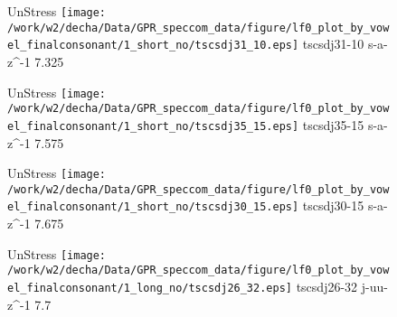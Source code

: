 \documentclass{article}
\begin{document}
\begin{figure}[t]
\begin{minipage}[b]{.24\textwidth}
UnStress
\centering
\texttt{[image: /work/w2/decha/Data/GPR\_speccom\_data/figure/lf0\_plot\_by\_vowel\_finalconsonant/1\_short\_no/tscsdj31\_10.eps]}
tscsdj31-10 s-a-z\textasciicircum-1 7.325
\end{minipage}
\begin{minipage}[b]{.24\textwidth}
UnStress
\centering
\texttt{[image: /work/w2/decha/Data/GPR\_speccom\_data/figure/lf0\_plot\_by\_vowel\_finalconsonant/1\_short\_no/tscsdj35\_15.eps]}
tscsdj35-15 s-a-z\textasciicircum-1 7.575
\end{minipage}
\begin{minipage}[b]{.24\textwidth}
UnStress
\centering
\texttt{[image: /work/w2/decha/Data/GPR\_speccom\_data/figure/lf0\_plot\_by\_vowel\_finalconsonant/1\_short\_no/tscsdj30\_15.eps]}
tscsdj30-15 s-a-z\textasciicircum-1 7.675
\end{minipage}
\begin{minipage}[b]{.24\textwidth}
UnStress
\centering
\texttt{[image: /work/w2/decha/Data/GPR\_speccom\_data/figure/lf0\_plot\_by\_vowel\_finalconsonant/1\_long\_no/tscsdj26\_32.eps]}
tscsdj26-32 j-uu-z\textasciicircum-1 7.7
\end{minipage}
\end{figure}
\end{document}
